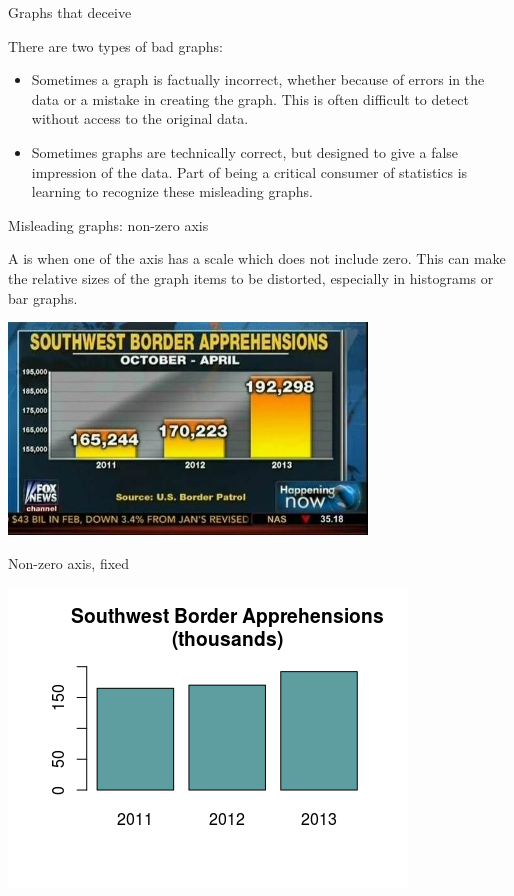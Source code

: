 \documentclass[]{beamer}
\begin{document}
\begin{frame}{Graphs that deceive}
\begin{block}{}
There are two types of bad graphs:
\begin{itemize}
\item Sometimes a graph is factually incorrect, whether because of errors in the data or a mistake in creating the graph. This is often difficult to detect without access to the original data.
\item Sometimes graphs are technically correct, but designed to give a false impression of the data. Part of being a critical consumer of statistics is learning to recognize these misleading graphs.
\end{itemize}
\end{block}
\end{frame}

\begin{frame}{Misleading graphs: non-zero axis}
\begin{block}{}
A  is when one of the axis has a scale which does not include zero. This can make the relative sizes of the graph items to be distorted, especially in histograms or bar graphs.
\end{block}
\pause
\begin{center}
\includegraphics[width=3.75in]{../images/ch02_bad_nonzero}\par
\end{center}
\end{frame}

\begin{frame}{Non-zero axis, fixed}
\begin{center}
\includegraphics{../images/ch02_bad_nonzero_fixed} 
\end{center}
\end{frame}
\end{document}
